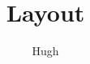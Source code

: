 \documentclass{grattan}
\author{Hugh}\title{Layout}
\begin{document}
\clearpage\newpage
 \layout
 \clearpage
 \nocite{*}
 \lipsum
\end{document}
